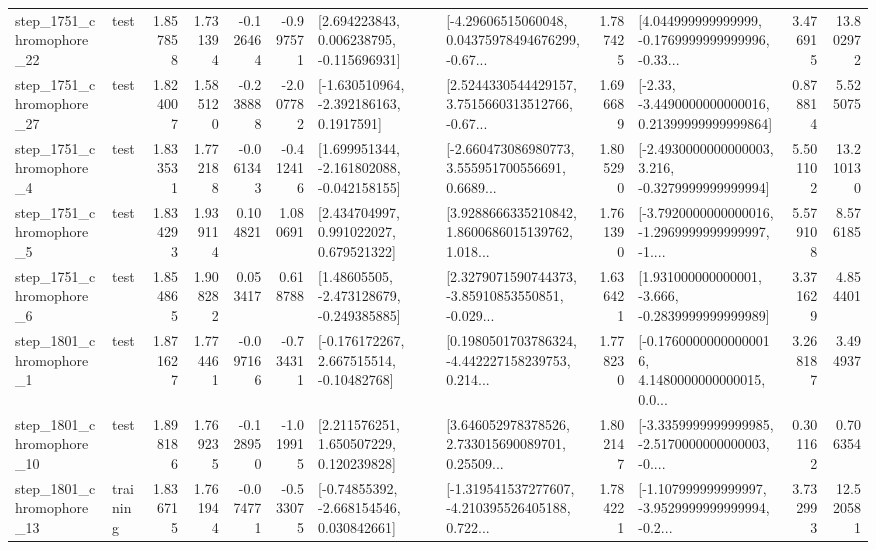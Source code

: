 \begin{tabular}{llrrrrllrlrr}
 step\_1751\_chromophore\_22 &      test &      1.857858 &    1.731394 &     -0.126464 & -0.997571 &    [2.694223843, 0.006238795, -0.115696931] &  [-4.29606515060048, 0.04375978494676299, -0.67... &       1.787425 &  [4.044999999999999, -0.1769999999999996, -0.33... &            3.476915 &         13.802972 \\
 step\_1751\_chromophore\_27 &      test &      1.824007 &    1.585120 &     -0.238888 & -2.007782 &     [-1.630510964, -2.392186163, 0.1917591] &  [2.5244330544429157, 3.7515660313512766, -0.67... &       1.696689 &  [-2.33, -3.4490000000000016, 0.21399999999999864] &            0.878814 &          5.525075 \\
  step\_1751\_chromophore\_4 &      test &      1.833531 &    1.772188 &     -0.061343 & -0.412416 &   [1.699951344, -2.161802088, -0.042158155] &  [-2.660473086980773, 3.555951700556691, 0.6689... &       1.805290 &  [-2.4930000000000003, 3.216, -0.3279999999999994] &            5.501102 &         13.210130 \\
  step\_1751\_chromophore\_5 &      test &      1.834293 &    1.939114 &      0.104821 &  1.080691 &     [2.434704997, 0.991022027, 0.679521322] &  [3.9288666335210842, 1.8600686015139762, 1.018... &       1.761390 &  [-3.7920000000000016, -1.2969999999999997, -1.... &            5.579108 &          8.576185 \\
  step\_1751\_chromophore\_6 &      test &      1.854865 &    1.908282 &      0.053417 &  0.618788 &    [1.48605505, -2.473128679, -0.249385885] &  [2.3279071590744373, -3.85910853550851, -0.029... &       1.636421 &   [1.931000000000001, -3.666, -0.2839999999999989] &            3.371629 &          4.854401 \\
  step\_1801\_chromophore\_1 &      test &      1.871627 &    1.774461 &     -0.097166 & -0.734311 &    [-0.176172267, 2.667515514, -0.10482768] &  [0.1980501703786324, -4.442227158239753, 0.214... &       1.778230 &  [-0.17600000000000016, 4.1480000000000015, 0.0... &            3.268187 &          3.494937 \\
 step\_1801\_chromophore\_10 &      test &      1.898186 &    1.769235 &     -0.128950 & -1.019915 &     [2.211576251, 1.650507229, 0.120239828] &  [3.646052978378526, 2.733015690089701, 0.25509... &       1.802147 &  [-3.3359999999999985, -2.5170000000000003, -0.... &            0.301162 &          0.706354 \\
 step\_1801\_chromophore\_13 &  training &      1.836715 &    1.761944 &     -0.074771 & -0.533075 &    [-0.74855392, -2.668154546, 0.030842661] &  [-1.319541537277607, -4.210395526405188, 0.722... &       1.784221 &  [-1.107999999999997, -3.9529999999999994, -0.2... &            3.732993 &         12.520581 \\

\end{tabular}
